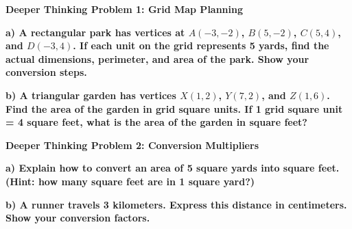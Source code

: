 \documentclass[12pt, letterpaper, fleqn]{article}
\begin{document}
\begin{tcolorbox}[colback=black!5, colframe=black!50, boxrule=1pt, arc=4mm, left=6mm, right=6mm, top=5mm, bottom=5mm]
\textbf{Deeper Thinking Problem 1: Grid Map Planning}

\medskip

\noindent
\textbf{a) A rectangular park has vertices at $A(-3, -2)$, $B(5, -2)$, $C(5, 4)$, and $D(-3, 4)$. If each unit on the grid represents 5 yards, find the actual dimensions, perimeter, and area of the park. Show your conversion steps.}

\vspace{2.5cm}

\noindent
\textbf{b) A triangular garden has vertices $X(1, 2)$, $Y(7, 2)$, and $Z(1, 6)$. Find the area of the garden in grid square units. If 1 grid square unit = 4 square feet, what is the area of the garden in square feet?}

\vspace{2cm}
\end{tcolorbox}
\newpage

\begin{tcolorbox}[colback=black!5, colframe=black!50, boxrule=1pt, arc=4mm, left=6mm, right=6mm, top=5mm, bottom=5mm]
\textbf{Deeper Thinking Problem 2: Conversion Multipliers}

\medskip

\noindent
\textbf{a) Explain how to convert an area of 5 square yards into square feet. (Hint: how many square feet are in 1 square yard?)}

\vspace{3cm}

\noindent
\textbf{b) A runner travels 3 kilometers. Express this distance in centimeters. Show your conversion factors.}

\vspace{3cm}
\end{tcolorbox}
\newpage
\end{document}

